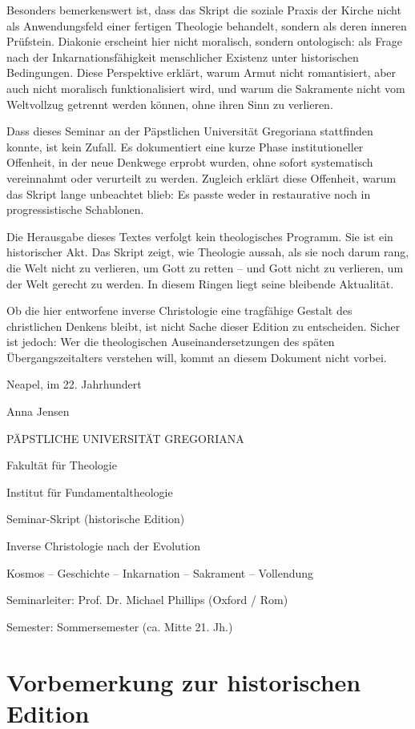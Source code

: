 \documentclass[
  ngerman,
]{article}
\begin{document}
Besonders bemerkenswert ist, dass das Skript die soziale Praxis der
Kirche nicht als Anwendungsfeld einer fertigen Theologie behandelt,
sondern als deren inneren Prüfstein. Diakonie erscheint hier nicht
moralisch, sondern ontologisch: als Frage nach der Inkarnationsfähigkeit
menschlicher Existenz unter historischen Bedingungen. Diese Perspektive
erklärt, warum Armut nicht romantisiert, aber auch nicht moralisch
funktionalisiert wird, und warum die Sakramente nicht vom Weltvollzug
getrennt werden können, ohne ihren Sinn zu verlieren.

Dass dieses Seminar an der Päpstlichen Universität Gregoriana
stattfinden konnte, ist kein Zufall. Es dokumentiert eine kurze Phase
institutioneller Offenheit, in der neue Denkwege erprobt wurden, ohne
sofort systematisch vereinnahmt oder verurteilt zu werden. Zugleich
erklärt diese Offenheit, warum das Skript lange unbeachtet blieb: Es
passte weder in restaurative noch in progressistische Schablonen.

Die Herausgabe dieses Textes verfolgt kein theologisches Programm. Sie
ist ein historischer Akt. Das Skript zeigt, wie Theologie aussah, als
sie noch darum rang, die Welt nicht zu verlieren, um Gott zu retten --
und Gott nicht zu verlieren, um der Welt gerecht zu werden. In diesem
Ringen liegt seine bleibende Aktualität.

Ob die hier entworfene inverse Christologie eine tragfähige Gestalt des
christlichen Denkens bleibt, ist nicht Sache dieser Edition zu
entscheiden. Sicher ist jedoch: Wer die theologischen
Auseinandersetzungen des späten Übergangszeitalters verstehen will,
kommt an diesem Dokument nicht vorbei.

Neapel, im 22. Jahrhundert

Anna Jensen

PÄPSTLICHE UNIVERSITÄT GREGORIANA

Fakultät für Theologie

Institut für Fundamentaltheologie

Seminar-Skript (historische Edition)

Inverse Christologie nach der Evolution

Kosmos -- Geschichte -- Inkarnation -- Sakrament -- Vollendung

Seminarleiter: Prof. Dr. Michael Phillips (Oxford / Rom)

Semester: Sommersemester (ca. Mitte 21. Jh.)

\section{Vorbemerkung zur historischen
Edition}\label{vorbemerkung-zur-historischen-edition}
\end{document}
